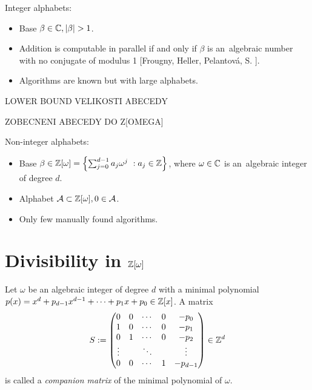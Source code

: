     Integer alphabets:
    \begin{itemize}
        \item Base $\beta \in \CC, |\beta|>1$.
        
        \item Addition is computable in parallel if and only if $\beta$ is an~algebraic number with no conjugate of modulus 1 [Frougny, Heller, Pelantov\'a, S. ].
        
        \item Algorithms are known but with large alphabets.
    \end{itemize}  
  LOWER BOUND VELIKOSTI ABECEDY
  
ZOBECNENI ABECEDY DO Z[OMEGA]   
    
    Non-integer alphabets:
    \begin{itemize}
        \item Base $\beta \in \mathbb{Z}[\omega]= \left\{\sum_{j=0}^{d-1} a_j \omega^j\ : a_j \in \mathbb{Z} \right\}$, where $\omega \in \mathbb{C}$ is an~algebraic integer of degree $d$.
        
        \item Alphabet $\mathcal{A} \subset \mathbb{Z}[\omega] , 0\in \mathcal{A}$.
        
        \item Only few manually found algorithms. 
    \end{itemize}
  


\section{Divisibility in $\mathbb{Z}[\omega]$}
\begin{defn}
Let $\omega$ be an algebraic integer of degree $d$ with a minimal polynomial $p(x)=x^d +p_{d-1}x^{d-1}+ \cdots + p_1 x+p_0 \in \mathbb{Z}[x]$. A matrix 
$$
S := \begin{pmatrix}
            0 & 0 & \cdots & 0 & -p_0 \\
            1 & 0 & \cdots & 0 & -p_1 \\
            0 & 1 & \cdots & 0 & -p_2 \\
            \vdots &   & \ddots & & \vdots \\
            0 & 0 & \cdots & 1 & -p_{d-1} 
            \end{pmatrix} \in \mathbb{Z}^d
$$
is called a \emph{companion matrix} of the minimal polynomial of $\omega$.
\end{defn}

